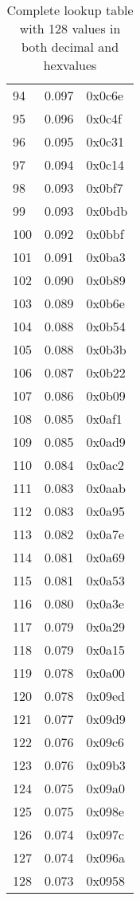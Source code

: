 \begin{table}[H]
\begin{subtable}[t]{0.30\linewidth}
\begin{tabular}{lll}
94 & 0.097 & 0x0c6e \\ 
95 & 0.096 & 0x0c4f \\ 
96 & 0.095 & 0x0c31 \\ 
97 & 0.094 & 0x0c14 \\ 
98 & 0.093 & 0x0bf7 \\ 
99 & 0.093 & 0x0bdb \\ 
100 & 0.092 & 0x0bbf \\ 
101 & 0.091 & 0x0ba3 \\ 
102 & 0.090 & 0x0b89 \\ 
103 & 0.089 & 0x0b6e \\ 
104 & 0.088 & 0x0b54 \\ 
105 & 0.088 & 0x0b3b \\ 
106 & 0.087 & 0x0b22 \\ 
107 & 0.086 & 0x0b09 \\ 
108 & 0.085 & 0x0af1 \\ 
109 & 0.085 & 0x0ad9 \\ 
110 & 0.084 & 0x0ac2 \\ 
111 & 0.083 & 0x0aab \\ 
112 & 0.083 & 0x0a95 \\ 
113 & 0.082 & 0x0a7e \\ 
114 & 0.081 & 0x0a69 \\ 
115 & 0.081 & 0x0a53 \\ 
116 & 0.080 & 0x0a3e \\ 
117 & 0.079 & 0x0a29 \\ 
118 & 0.079 & 0x0a15 \\ 
119 & 0.078 & 0x0a00 \\ 
120 & 0.078 & 0x09ed \\ 
121 & 0.077 & 0x09d9 \\ 
122 & 0.076 & 0x09c6 \\ 
123 & 0.076 & 0x09b3 \\ 
124 & 0.075 & 0x09a0 \\ 
125 & 0.075 & 0x098e \\ 
126 & 0.074 & 0x097c \\ 
127 & 0.074 & 0x096a \\ 
128 & 0.073 & 0x0958 \\
  \bottomrule
\end{tabular}
\end{subtable}
\vspace{-1.7cm}
\caption{Complete lookup table with 128 values in both decimal and hexvalues}\label{tbl:lookup}
\end{table}